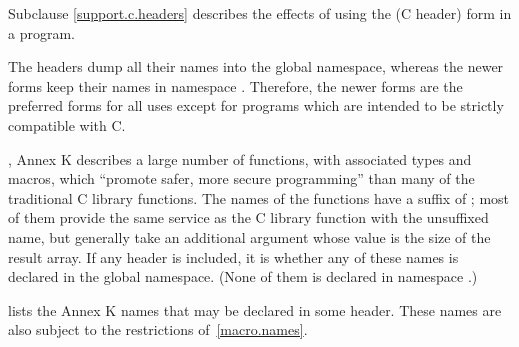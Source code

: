 \pnum
Subclause \ref{support.c.headers} describes the effects of using
the  (C header) form in a \Cpp{} program.
\begin{footnote}
 The
 headers dump all their names into the global namespace, whereas the
newer forms keep their names in namespace . Therefore, the newer
forms are the preferred forms for all uses except for \Cpp{} programs which are
intended to be strictly compatible with C.
\end{footnote}

\pnum
\IsoC{}, Annex K describes a large number of functions,
with associated types and macros,
which ``promote safer, more secure programming''
than many of the traditional C library functions.
The names of the functions have a suffix of ;
most of them provide the same service
as the C library function with the unsuffixed name,
but generally take an additional argument
whose value is the size of the result array.
If any \Cpp{} header is included,
it is 
whether any of these names
is declared in the global namespace.
(None of them is declared in namespace .)

\pnum
{} lists the Annex K names
that may be declared in some header.
These names are also subject to the restrictions of~\ref{macro.names}.

